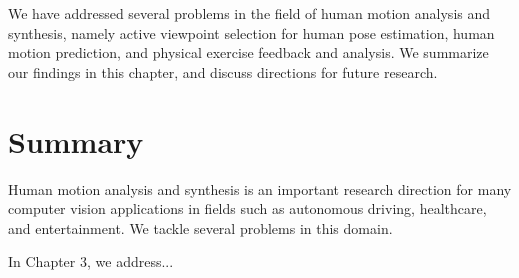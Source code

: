 %
%
%
%

\begin{conclusion}
We have addressed several problems in the field of human motion analysis and synthesis, namely active viewpoint selection for human pose estimation, human motion prediction, and physical exercise feedback and analysis. We summarize our findings in this chapter, and discuss directions for future research.

\section{Summary}
Human motion analysis and synthesis is an important research direction for many computer vision applications in fields such as autonomous driving, healthcare, and entertainment. We tackle several problems in this domain.

In Chapter 3, we address...


\end{conclusion}
